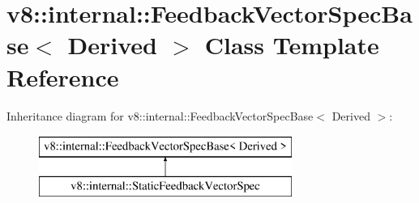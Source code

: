 \hypertarget{classv8_1_1internal_1_1_feedback_vector_spec_base}{}\section{v8\+:\+:internal\+:\+:Feedback\+Vector\+Spec\+Base$<$ Derived $>$ Class Template Reference}
\label{classv8_1_1internal_1_1_feedback_vector_spec_base}
Inheritance diagram for v8\+:\+:internal\+:\+:Feedback\+Vector\+Spec\+Base$<$ Derived $>$\+:\begin{figure}[H]
\begin{center}
\leavevmode
\includegraphics[height=2.000000cm]{classv8_1_1internal_1_1_feedback_vector_spec_base}
\end{center}
\end{figure}
